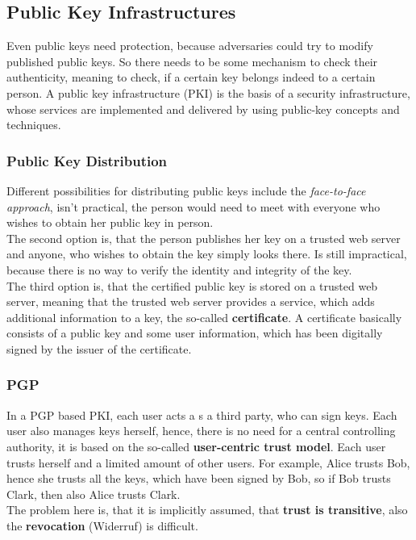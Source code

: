\documentclass[a4paper, 10 pt, conference]{ieeeconf}
\begin{document}
\subsection{\textbf{Public Key Infrastructures}}
Even public keys need protection, because adversaries could try to modify published public keys. 
So there needs to be some mechanism to check their authenticity, meaning to check, if a certain key belongs indeed to a certain person. 
A public key infrastructure (PKI) is the basis of a security infrastructure, whose services are implemented and delivered by using public-key concepts and techniques. 
\vspace{0.5cm}
\subsubsection{\textbf{Public Key Distribution}}
Different possibilities for distributing public keys include the \emph{face-to-face approach}, isn't practical, the person would need to meet with everyone who wishes to obtain her public key in person. \\
The second option is, that the person publishes her key on a trusted web server and anyone, who wishes to obtain the key simply looks there. Is still impractical, because there is no way to verify the identity and integrity of the key. \\
The third option is, that the certified public key is stored on a trusted web server, meaning that the trusted web server provides a service, which adds additional information to a key, the so-called \textbf{certificate}.
A certificate basically consists of a public key and some user information, which has been digitally signed by the issuer of the certificate. 
\vspace{0.5cm}
\subsubsection{\textbf{PGP}}
In a PGP based PKI, each user acts a s a third party, who can sign keys. Each user also manages keys herself, hence, there is no need for a central controlling authority, it is based on the so-called \textbf{user-centric trust model}. Each user trusts herself and a limited amount of other users. 
For example, Alice trusts Bob, hence she trusts all the keys, which have been signed by Bob, so if Bob trusts Clark, then also Alice trusts Clark. \\
The problem here is, that it is implicitly assumed, that \textbf{trust is transitive}, also the \textbf{revocation} (Widerruf) is difficult. 
\vspace{0.5cm}
\end{document}
